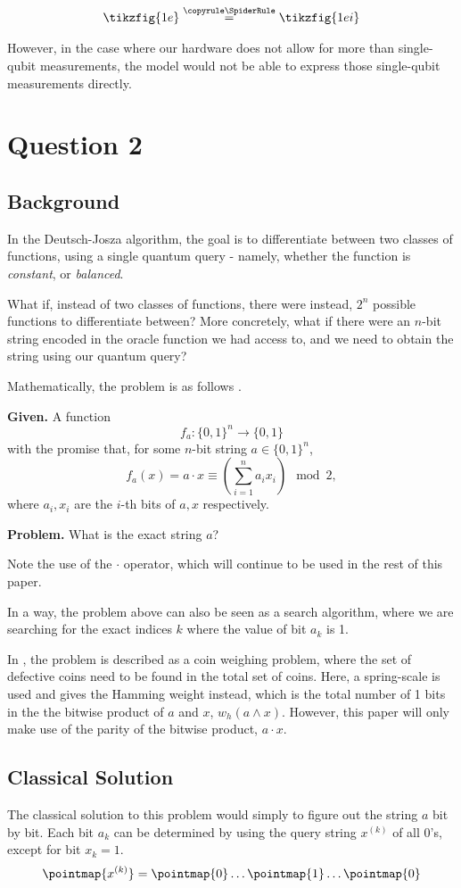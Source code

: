 \documentclass[11pt]{article} %
\theoremstyle{definition}
\begin{document}
\[\tikzfig{1e}\stackrel{\copyrule\SpiderRule}{=}\tikzfig{1ei}\]

However, in the case where our hardware does not allow for more than single-qubit measurements,
the model would not be able to express those single-qubit measurements directly.

\clearpage
\section*{Question 2}
\subsection*{Background}
In the Deutsch-Josza algorithm, the goal is to differentiate between two classes of functions,
using a single quantum query \cite{Deutsch_1992} - 
namely, whether the function is \textit{constant}, or \textit{balanced}.

What if, instead of two classes of functions, there were instead, 
$2^n$ possible functions to differentiate between?
More concretely, what if there were an $n$-bit string encoded in the oracle function we had access to,
and we need to obtain the string using our quantum query?

Mathematically, the problem is as follows \cite{Bernstein_1997}.

\textbf{Given.} A function 
\[f_a:\{0,1\}^n \rightarrow \{0,1\}\] 
with the promise that, for some $n$-bit string $a\in\{0,1\}^n$,
\[f_a(x)=a\cdot x \equiv \left(\sum_{i=1}^n a_i x_i\right) \mod 2,\]
where $a_i,x_i$ are the $i$-th bits of $a,x$ respectively.

\textbf{Problem.} What is the exact string $a$?

Note the use of the $\cdot$ operator, which will continue to be used in the rest of this paper.

In a way, the problem above can also be seen as a search algorithm, 
where we are searching for the exact indices $k$ where the value of bit $a_k$ is 1.

In \cite{Terhal_1998}, the problem is described as a coin weighing problem, 
where the set of defective coins need to be found in the total set of coins.
Here, a spring-scale is used and gives the Hamming weight instead,
which is the total number of 1 bits in the the bitwise product of $a$ and $x$, $w_h(a\wedge x)$.
However, this paper will only make use of the parity of the bitwise product, $a\cdot x$.

\subsection*{Classical Solution}
The classical solution to this problem would simply to figure out the string $a$ bit by bit.
Each bit $a_k$ can be determined by using the query string $x^{(k)}$ of all 0's, except for bit $x_k=1$.
\[\pointmap{x^{(k)}}=\pointmap{0}\dots\pointmap{1}\dots\pointmap{0}\]
\end{document}
